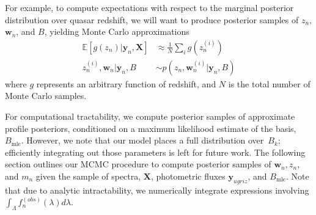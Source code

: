 \documentclass{article}
\begin{document}
For example, to compute expectations with respect to the marginal posterior distribution over quasar redshift, we will want to produce posterior samples of $z_n$, $\mathbf{w}_n$, and $B$, yielding Monte Carlo approximations
\begin{align}
  \mathbb{E}[ g(z_n) | \mathbf{y}_n, \mathbf{X} ] 
    &\approx \frac{1}{N} \sum_{i} g(z_n^{(i)}) \\
    z_n^{(i)}, \mathbf{w}_n | \mathbf{y}_n, B &\sim p(z_n, \mathbf{w}_n^{(i)} | \mathbf{y}_n, B) 
\end{align}
where $g$ represents an arbitrary function of redshift, and $N$ is the total number of Monte Carlo samples.  

For computational tractability, we compute posterior samples of approximate profile posteriors, conditioned on a maximum likelihood estimate of the basis,~$B_{\text{mle}}$. 
However, we note that our model places a full distribution over~$B_k$; efficiently integrating out those parameters is left for future work.
The following section outlines our MCMC procedure to compute posterior samples of $\mathbf{w}_n, z_n$, and $m_n$ given the sample of spectra, $\mathbf{X}$, photometric fluxes $\mathbf{y}_{ugriz}$, and $B_{\text{mle}}$.
Note that due to analytic intractability, we numerically integrate expressions involving $\int_\Lambda f_n^{(obs)}(\lambda) d\lambda$.

\end{document}
